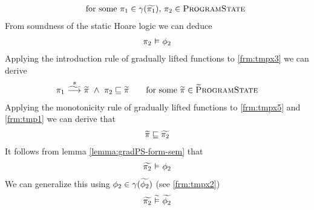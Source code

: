 \begin{proofatend}
\begin{description}
\begin{align}
        \quad\quad\text{for some } \pi_1 \in \gamma(\widetilde{\pi_1}),\, \pi_2 \in \textup{\textsc{ProgramState}}
        \end{align}
        From soundness of the static Hoare logic we can deduce
        \begin{align}
        \label{frm:tmpx4}
        \evalphiGen{\pi_2}{\phi_2}
        \end{align}
        Applying the introduction rule of gradually lifted functions to \ref{frm:tmpx3} we can derive
        \begin{align}
        \label{frm:tmpx5}
        \gsstepConsume{s}{\pi_1}{\grad{\pi}} ~\wedge~ \pi_2 \sqsubseteq \grad{\pi}
        \quad\quad\text{for some } \grad{\pi} \in \setGProgramState
        \end{align}
        Applying the monotonicity rule of gradually lifted functions to \ref{frm:tmpx5} and \ref{frm:tmp1} we can derive that
        \begin{align}
        \label{frm:tmpx7}
        \grad{\pi} \mpt \grad{\pi_2}
        \end{align}
        It follows from lemma \ref{lemma:gradPS-form-sem} that
        \begin{align}
        \label{frm:tmpx8}
        \evalphiGen{\grad{\pi_2}}{\phi_2}
        \end{align}
        We can generalize this using $\phi_2 \in \gamma(\widetilde{\phi_2})$ (see \ref{frm:tmpx2})
        \begin{align}
        \label{frm:tmpx9}
        \evalgphiGen{\grad{\pi_2}}{\grad{\phi_2}}
        \end{align}
        

\end{description}
\end{proofatend}
